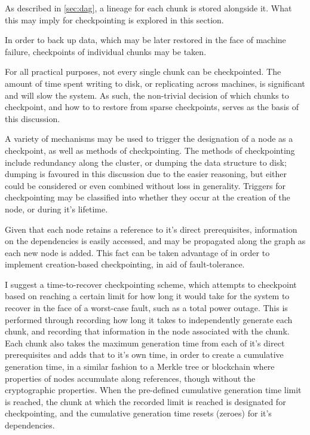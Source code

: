 As described in \cref{sec:dag}, a lineage for each chunk is stored alongside it.
What this may imply for checkpointing is explored in this section.

In order to back up data, which may be later restored in the face of machine failure, checkpoints of individual chunks may be taken\cite{elnozahy2002recovery}.

For all practical purposes, not every single chunk can be checkpointed.
The amount of time spent writing to disk, or replicating across machines, is significant and will slow the system.
As such, the non-trivial decision of which chunks to checkpoint, and how to to restore from sparse checkpoints, serves as the basis of this discussion.

A variety of mechanisms may be used to trigger the designation of a node as a checkpoint, as well as methods of checkpointing.
The methods of checkpointing include redundancy along the cluster, or dumping the data structure to disk; dumping is favoured in this discussion due to the easier reasoning, but either could be considered or even combined without loss in generality\cite{walters2009replication}.
Triggers for checkpointing may be classified into whether they occur at the creation of the node, or during it's lifetime.

Given that each node retains a reference to it's direct prerequisites, information on the dependencies is easily accessed, and may be propagated along the graph as each new node is added.
This fact can be taken advantage of in order to implement creation-based checkpointing, in aid of fault-tolerance.

I suggest a time-to-recover checkpointing scheme, which attempts to checkpoint based on reaching a certain limit for how long it would take for the system to recover in the face of a worst-case fault, such as a total power outage.
This is performed through recording how long it takes to independently generate each chunk, and recording that information in the node associated with the chunk.
Each chunk also takes the maximum generation time from each of it's direct prerequisites and adds that to it's own time, in order to create a cumulative generation time, in a similar fashion to a Merkle tree or blockchain where properties of nodes accumulate along references, though without the cryptographic properties\cites{merkle1988tree,nakamoto2008bitcoin}.
When the pre-defined cumulative generation time limit is reached, the chunk at which the recorded limit is reached is designated for checkpointing, and the cumulative generation time resets (zeroes) for it's dependencies.

